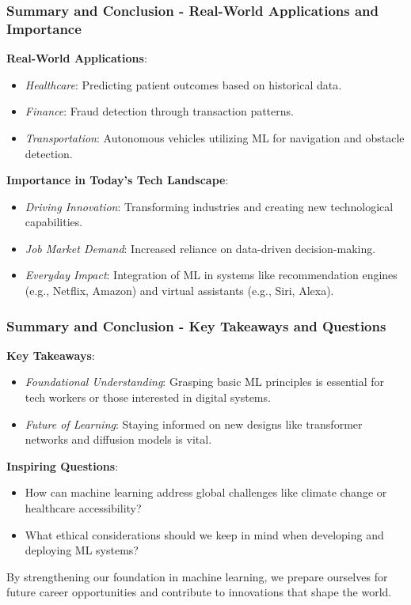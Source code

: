 \documentclass[aspectratio=169]{beamer}
\begin{document}
\begin{frame}[fragile]
    \frametitle{Summary and Conclusion - Real-World Applications and Importance}
    
    \textbf{Real-World Applications}:
    \begin{itemize}
        \item \textit{Healthcare}: Predicting patient outcomes based on historical data.
        \item \textit{Finance}: Fraud detection through transaction patterns.
        \item \textit{Transportation}: Autonomous vehicles utilizing ML for navigation and obstacle detection.
    \end{itemize}
    
    \textbf{Importance in Today’s Tech Landscape}:
    \begin{itemize}
        \item \textit{Driving Innovation}: Transforming industries and creating new technological capabilities.
        \item \textit{Job Market Demand}: Increased reliance on data-driven decision-making.
        \item \textit{Everyday Impact}: Integration of ML in systems like recommendation engines (e.g., Netflix, Amazon) and virtual assistants (e.g., Siri, Alexa).
    \end{itemize}
\end{frame}

\begin{frame}[fragile]
    \frametitle{Summary and Conclusion - Key Takeaways and Questions}
    
    \textbf{Key Takeaways}:
    \begin{itemize}
        \item \textit{Foundational Understanding}: Grasping basic ML principles is essential for tech workers or those interested in digital systems.
        \item \textit{Future of Learning}: Staying informed on new designs like transformer networks and diffusion models is vital.
    \end{itemize}
    
    \textbf{Inspiring Questions}:
    \begin{itemize}
        \item How can machine learning address global challenges like climate change or healthcare accessibility?
        \item What ethical considerations should we keep in mind when developing and deploying ML systems?
    \end{itemize}
    
    By strengthening our foundation in machine learning, we prepare ourselves for future career opportunities and contribute to innovations that shape the world.
\end{frame}
\end{document}
